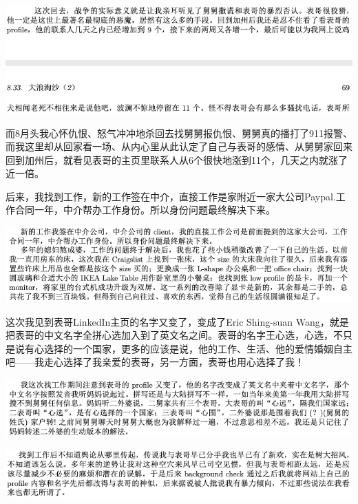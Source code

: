 \documentclass[9pt, b5paper]{article}
\begin{document}
\begin{center}
\includegraphics[width=.9\linewidth]{./pic/p1p69-1.png}
\end{center}

而8月头我心怀仇恨、怒气冲冲地杀回去找舅舅报仇恨、舅舅真的播打了911报警、而我这里却从回家看一场、从内心里从此认定了自己与表哥的感情、从舅舅家回来回到加州后，就看见表哥的主页里联系人从6个很快地涨到11个，几天之内就涨了近一倍。 

后来，我找到工作，新的工作签在中介，直接工作是家附近一家大公司Paypal.工作合同一年，中介帮办工作身份。所以身份问题最终解决下来。 

\begin{center}
\includegraphics[width=.9\linewidth]{./pic/p1p102.png}
\end{center}

这次我见到表哥LinkedIn主页的名字又变了，变成了Eric Shing-suan Wang，就是把表哥的中文名字全拼心选加入到了英文名之间。表哥的名字王心选，心选，不只是说有心选择的一个国家，更多的应该是说，他的工作、生活、他的爱情婚姻自主吧——我走心选择了我亲爱的表哥，另一方面，表哥也用心选择了我！

\begin{center}
\includegraphics[width=.9\linewidth]{./pic/p1p102-2.png}
\end{center}

\begin{center}
\includegraphics[width=.9\linewidth]{./pic/p1p102-3.png}
\end{center}
\end{document}

